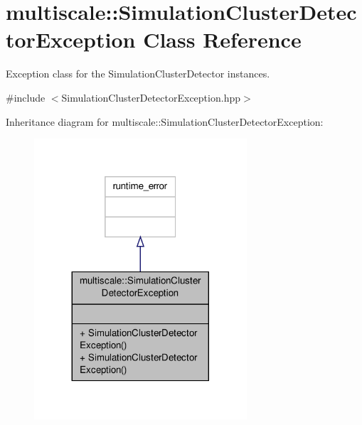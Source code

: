 \hypertarget{classmultiscale_1_1SimulationClusterDetectorException}{\section{multiscale\-:\-:Simulation\-Cluster\-Detector\-Exception Class Reference}
\label{classmultiscale_1_1SimulationClusterDetectorException}
}


Exception class for the Simulation\-Cluster\-Detector instances.  




{\ttfamily \#include $<$Simulation\-Cluster\-Detector\-Exception.\-hpp$>$}



Inheritance diagram for multiscale\-:\-:Simulation\-Cluster\-Detector\-Exception\-:\nopagebreak
\begin{figure}[H]
\begin{center}
\leavevmode
\includegraphics[width=224pt]{classmultiscale_1_1SimulationClusterDetectorException__inherit__graph}
\end{center}
\end{figure}



